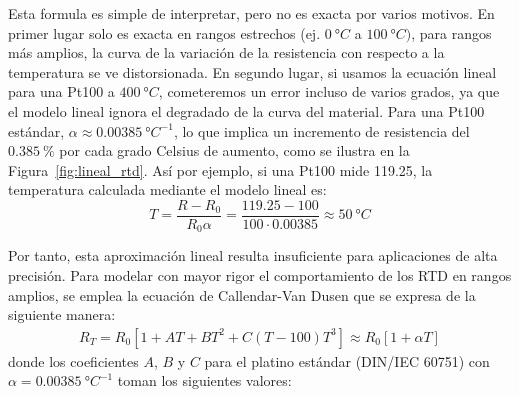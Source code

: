 Esta formula es simple de interpretar, pero no es exacta por varios motivos. En primer lugar solo es exacta en rangos estrechos (ej. $\qty{0}{\degree C}$ a $\qty{100}{\degree C})$, para rangos más amplios, la curva de la variación de la resistencia con respecto a la temperatura se ve distorsionada. En segundo lugar, si usamos la ecuación lineal para una Pt100 a $\qty{400}{\degree C}$, cometeremos un error incluso de varios grados, ya que el modelo lineal ignora el degradado de la curva del material. Para una Pt100 estándar, $\alpha \approx \qty{0.00385}{\degree C^{-1}}$, lo que implica un incremento de resistencia del $\qty{0.385}{\percent}$ por cada grado Celsius de aumento, como se ilustra en la Figura~\ref{fig:lineal_rtd}. Así por ejemplo, si una Pt100 mide \qty{119.25}{\Omega}, la temperatura calculada mediante el modelo lineal es:
    \[ T = \frac{R - R_0}{R_0 \alpha} = \frac{119.25 - 100}{100 \cdot 0.00385} \approx \qty{50}{\degree C} 
    \]

\begin{marginfigure}
    \centering
    \shorthandoff{>}
    \caption[Resistencia de un Pt100.]{Respuesta lineal de una Pt100. La pendiente $R_0 \alpha \approx \qty{0.385}{\Omega/\degree C}$ define la ganancia necesaria en la etapa de amplificación.}\label{fig:lineal_rtd}
\end{marginfigure}


Por tanto, esta aproximación lineal resulta insuficiente para aplicaciones de alta precisión. Para modelar con mayor rigor el comportamiento de los RTD en rangos amplios, se emplea la ecuación de Callendar-Van Dusen que se expresa de la siguiente manera:
\begin{equation} \label{eq:ecuacion_cv} \begin{split}   
    R_T =  R_0 \left[ 1 + AT + BT^2 + C(T - 100)T^3 \right] \approx R_0 \left[1 + \alpha T \right]
\end{split} \end{equation}    
donde los coeficientes $A$, $B$ y $C$ para el platino estándar (DIN/IEC 60751) con $\alpha = \qty{0.00385}{\degree C^{-1}}$ toman los siguientes valores:


